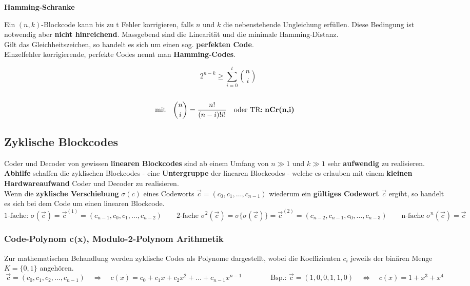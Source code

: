 \textbf{Hamming-Schranke}\\
\begin{minipage}{12cm}
	Ein $(n,k)$-Blockcode kann bis zu t Fehler korrigieren, falls $n$
	und $k$ die nebenstehende Ungleichung erfüllen. Diese Bedingung ist notwendig aber \textbf{nicht
	hinreichend}. Massgebend sind die Linearität und die minimale Hamming-Distanz. \\
	Gilt das Gleichheitszeichen, so handelt es sich um einen sog. \textbf{perfekten Code}. \\
	Einzelfehler korrigierende, perfekte Codes nennt man \textbf{Hamming-Codes}.
\end{minipage} 
\begin{minipage}{7cm}
	$$ \qquad 2^{n-k} \geq \sum\limits_{i=0}^{t} \binom{n}{i} \quad$$ \\
	$$ \text{mit} \quad \binom{n}{i} = \dfrac{n!}{(n-i)! i!} \quad \text{oder TR: \textbf{nCr(n,i)}}$$
\end{minipage}

\newpage

\subsection{Zyklische Blockcodes }
Coder und Decoder von gewissen \textbf{linearen Blockcodes} sind ab einem Umfang von $n \gg 1$ und
$k \gg 1$ sehr \textbf{aufwendig} zu realisieren. \\
\textbf{Abhilfe} schaffen die zyklischen Blockcodes - eine \textbf{Untergruppe} der linearen Blockcodes - welche es erlauben mit einem \textbf{kleinen Hardwareaufwand} Coder und Decoder zu realisieren.\\
Wenn die \textbf{zyklische Verschiebung} $\sigma (c)$ eines Codeworts $\vec{c} = (c_0, c_1, \ldots, c_{n-1})$ wiederum ein \textbf{gültiges Codewort} $\vec{c}$ ergibt, so handelt es sich bei dem Code um einen linearen Blockcode.
$$ \text{1-fache: }\sigma(\vec{c}) = \vec{c}^{(1)} = (c_{n-1}, c_0, c_1, \ldots, c_{n-2}) \qquad 
\text{2-fache }\sigma^2(\vec{c}) = \sigma\{\sigma(\vec{c})\}= \vec{c}^{(2)} = (c_{n-2}, c_{n-1}, c_0, \ldots, c_{n-3}) \qquad
\text{n-fache }\sigma^n(\vec{c}) = \vec{c} $$


\subsubsection{Code-Polynom c(x), Modulo-2-Polynom Arithmetik}
Zur mathematischen Behandlung werden zyklische Codes als Polynome dargestellt, wobei die
Koeffizienten $c_i$ jeweils der binären Menge $K=\{0,1\}$ angehören.
$$ \vec{c} = (c_0, c_1, c_2, \ldots,
c_{n-1}) \quad \Longrightarrow \quad c(x) = c_0 + c_1 x + c_2 x^2 + \ldots + c_{n-1} x^{n-1} 
\qquad \qquad \text{Bsp.: } \vec{c} = (1, 0, 0, 1, 1, 0) \quad \Longleftrightarrow \quad c(x) = 1 + x^3 +
x^4$$

